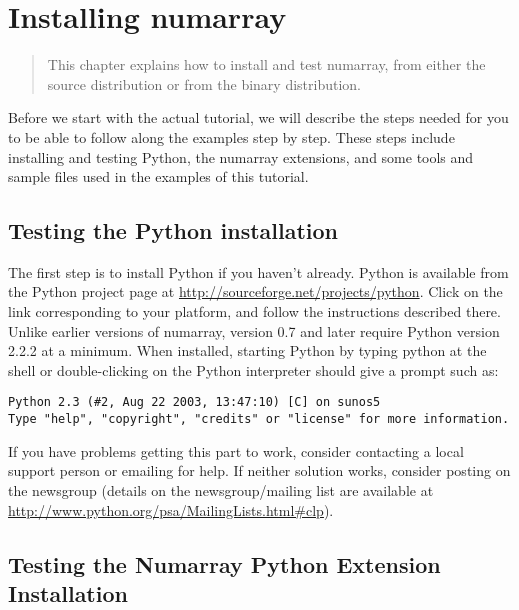 \chapter{Installing numarray}
\label{cha:installation}

\begin{quote}
   This chapter explains how to install and test numarray, from either the
   source distribution or from the binary distribution.
\end{quote}

Before we start with the actual tutorial, we will describe the steps needed for
you to be able to follow along the examples step by step. These steps include
installing and testing Python, the numarray extensions, and some tools and
sample files used in the examples of this tutorial.


\section{Testing the Python installation}

The first step is to install Python if you haven't already. Python is available
from the Python project page at \url{http://sourceforge.net/projects/python}.
Click on the link corresponding to your platform, and follow the instructions
described there. Unlike earlier versions of numarray, version 0.7 and later
require Python version 2.2.2 at a minimum.  When installed, starting Python by
typing python at the shell or double-clicking on the Python interpreter should
give a prompt such as:
\begin{verbatim}
Python 2.3 (#2, Aug 22 2003, 13:47:10) [C] on sunos5
Type "help", "copyright", "credits" or "license" for more information.
\end{verbatim}
If you have problems getting this part to work, consider contacting a local
support person or emailing
 for help. If
neither solution works, consider posting on the
 newsgroup (details on the
newsgroup/mailing list are available at
\url{http://www.python.org/psa/MailingLists.html\#clp}).


\section{Testing the Numarray Python Extension Installation}

